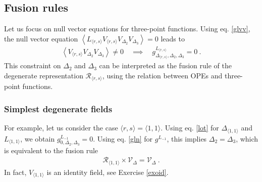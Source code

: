 \documentclass[12pt, a4paper, notitlepage, twoside]{report}
\numberwithin{equation}{section}
\theoremstyle{break}
\begin{document}
\subsection{Fusion rules}\label{secfr}

Let us focus on null vector equations for three-point functions. 
Using eq. \eqref{glvv},
the null vector equation $\left< L_{\langle r,s \rangle} V_{\langle r,s \rangle} V_{\Delta_2}V_{\Delta_3}\right>=0$ leads to
\begin{align}
 \left< V_{\langle r,s \rangle} V_{\Delta_2}V_{\Delta_3}\right>\neq 0 \quad \implies \quad g^{L_{\langle r,s \rangle}}_{\Delta_{\langle r,s \rangle},\Delta_2,\Delta_3} = 0 \ .
\end{align}
This constraint on $\Delta_2$ and $\Delta_3$ can be interpreted as the fusion rule of the degenerate representation $\mathcal{R}_{\langle r,s \rangle}$, using the relation between OPEs and three-point functions.

\subsubsection{Simplest degenerate fields}

For example, let us consider the case $\langle r,s \rangle = \langle 1,1 \rangle$.
Using eq. \eqref{lot} for $\Delta_{\langle 1,1 \rangle}$ and $L_{\langle 1,1 \rangle}$, we obtain
$g^{L_{-1}}_{0,\Delta_2,\Delta_3} = 0$.
Using eq. \eqref{gln} for $g^{L_{-1}}$, this implies 
$
 \Delta_2=\Delta_3
$,
which is equivalent to the fusion rule
\begin{align}
 \boxed{\mathcal{R}_{\langle 1,1\rangle} \times \mathcal{V}_\Delta = \mathcal{V}_\Delta} \ .
 \label{roof}
\end{align}
In fact, $V_{\langle 1,1\rangle}$ is an identity field, see Exercise \ref{exoid}.
\end{document}
